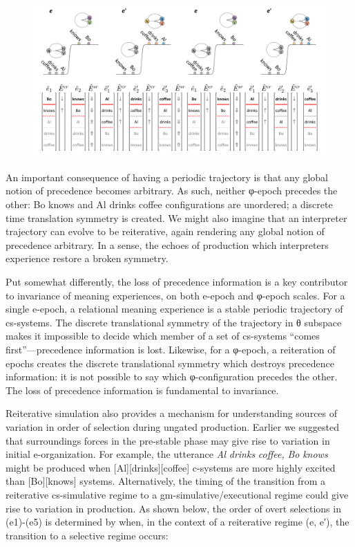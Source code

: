   
\begin{figure}
\includegraphics[width=\textwidth]{figures/Tilsen-img115.png}
\caption{\missingcaption}
\label{fig:}
\end{figure}
 

  An important consequence of having a periodic trajectory is that any global notion of precedence becomes arbitrary. As such, neither φ-epoch precedes the other: {\textbar}Bo knows{\textbar} and {\textbar}Al drinks coffee{\textbar} configurations are unordered; a discrete time translation symmetry is created. We might also imagine that an interpreter trajectory can evolve to be reiterative, again rendering any global notion of precedence arbitrary. In a sense, the echoes of production which interpreters experience restore a broken symmetry. 

  Put somewhat differently, the loss of precedence information is a key contributor to invariance of meaning experiences, on both e-epoch and φ-epoch scales. For a single e-epoch, a relational meaning experience is a stable periodic trajectory of cs-systems. The discrete translational symmetry of the trajectory in θ subspace makes it impossible to decide which member of a set of cs-systems “comes first”—precedence information is lost. Likewise, for a φ-epoch, a reiteration of epochs creates the discrete translational symmetry which destroys precedence information: it is not possible to say which φ-configuration precedes the other. The loss of precedence information is fundamental to invariance. 

  Reiterative simulation also provides a mechanism for understanding sources of variation in order of selection during ungated production. Earlier we suggested that surroundings forces in the pre-stable phase may give rise to variation in initial e-organization. For example, the utterance \textit{Al} \textit{drinks} \textit{coffee,} \textit{Bo} \textit{knows} might be produced when [Al][drinks][coffee] c-systems are more highly excited than [Bo][knows] systems. Alternatively, the timing of the transition from a reiterative cs-simulative regime to a gm-simulative/executional regime could give rise to variation in production. As shown below, the order of overt selections in (e1)-(e5) is determined by when, in the context of a reiterative regime (e, e′), the transition to a selective regime occurs:

